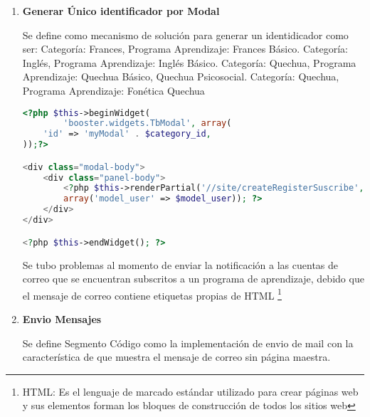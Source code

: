\begin{enumerate}

\item \textbf{Generar \'{U}nico identificador por Modal}

Se define como mecanismo de soluci\'{o}n para generar un identidicador como ser:
Categor\'{i}a: Frances, Programa Aprendizaje: Frances B\'{a}sico. Categor\'{i}a:
Ingl\'{e}s, Programa Aprendizaje: Ingl\'{e}s B\'{a}sico. Categor\'{i}a: Quechua,
Programa Aprendizaje: Quechua B\'{a}sico, Quechua Psicosocial. Categor\'{i}a: Quechua,
Programa Aprendizaje: Fon\'{e}tica Quechua

\begin{lstlisting}[language = PHP]
<?php $this->beginWidget(
        'booster.widgets.TbModal', array(
    'id' => 'myModal' . $category_id,
));?>

<div class="modal-body">
    <div class="panel-body">
        <?php $this->renderPartial('//site/createRegisterSuscribe', 
        array('model_user' => $model_user)); ?>
    </div>
</div>

<?php $this->endWidget(); ?>
\end{lstlisting}

Se tubo problemas al momento de enviar la notificaci\'{o}n a las cuentas de correo
que se encuentran subscritos a un programa de aprendizaje, debido que el mensaje de 
correo contiene etiquetas propias de HTML \footnote{HTML: Es el lenguaje de marcado
est\'{a}ndar utilizado para crear p\'{a}ginas web y sus elementos forman los bloques
de construcci\'{o}n de todos los sitios web}

\item \textbf{Envio Mensajes}

Se define Segmento C\'{o}digo como la implementaci\'{o}n de envio de mail con la 
caracter\'{i}stica de que muestra el mensaje de correo sin p\'{a}gina maestra.


\end{enumerate}
